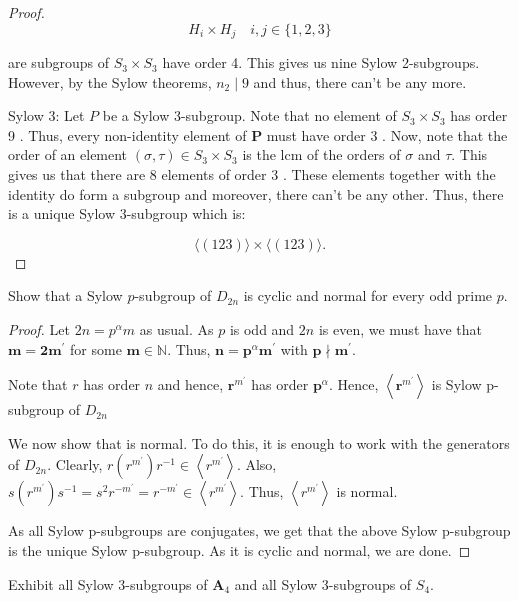 \begin{proof}
    $$
    H_i \times H_j \quad i, j \in\{1,2,3\}
    $$
    
    are subgroups of $S_3 \times S_3$ have order 4. This gives us nine Sylow 2-subgroups. However, by the Sylow theorems, $n_2 \mid 9$ and thus, there can't be any more.

    Sylow 3:
    Let $P$ be a Sylow 3-subgroup. Note that no element of $S_3 \times S_3$ has order 9 . Thus, every non-identity element of $\boldsymbol{P}$ must have order 3 . Now, note that the order of an element $(\sigma, \tau) \in S_3 \times S_3$ is the lcm of the orders of $\sigma$ and $\tau$. This gives us that there are 8 elements of order 3 . These elements together with the identity do form a subgroup and moreover, there can't be any other. Thus, there is a unique Sylow 3-subgroup which is:
    
    $$
    \langle(123)\rangle \times\langle(123)\rangle .
    $$    
\end{proof}


\begin{exercise}
Show that a Sylow $p$-subgroup of $D_{2 n}$ is cyclic and normal for every odd prime $p$.
\end{exercise}


\begin{proof}
Let $2 n=p^\alpha m$ as usual. As $p$ is odd and $2 n$ is even, we must have that $\boldsymbol{m}=\mathbf{2} \boldsymbol{m}^{\prime}$ for some $\boldsymbol{m} \in \mathbb{N}$. Thus, $\boldsymbol{n}=\boldsymbol{p}^\alpha \boldsymbol{m}^{\prime}$ with $\boldsymbol{p} \nmid  \boldsymbol{m}^{\prime}$.

Note that $r$ has order $n$ and hence, $\boldsymbol{r}^{m^{\prime}}$ has order $\boldsymbol{p}^\alpha$. Hence, $\left\langle\boldsymbol{r}^{m^{\prime}}\right\rangle$ is Sylow p-subgroup of $D_{2 n}$

We now show that is normal. To do this, it is enough to work with the generators of $D_{2 n}$. Clearly, $r\left(r^{m^{\prime}}\right) r^{-1} \in\left\langle r^{m^{\prime}}\right\rangle$. Also, $s\left(r^{m^{\prime}}\right) s^{-1}=s^2 r^{-m^{\prime}}=r^{-m^{\prime}} \in\left\langle r^{m^{\prime}}\right\rangle$. Thus, $\left\langle r^{m^{\prime}}\right\rangle$ is normal.

As all Sylow p-subgroups are conjugates, we get that the above Sylow p-subgroup is the unique Sylow p-subgroup. As it is cyclic and normal, we are done.
\end{proof}


\begin{exercise}
Exhibit all Sylow 3-subgroups of $\boldsymbol{A}_4$ and all Sylow 3-subgroups of $S_4$.
\end{exercise}

